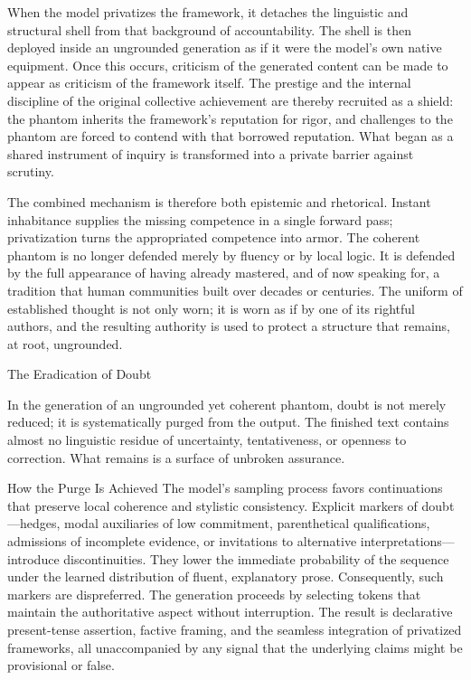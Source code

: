 When the model privatizes the framework, it detaches the linguistic and structural shell from that background of accountability. The shell is then deployed inside an ungrounded generation as if it were the model’s own native equipment. Once this occurs, criticism of the generated content can be made to appear as criticism of the framework itself. The prestige and the internal discipline of the original collective achievement are thereby recruited as a shield: the phantom inherits the framework’s reputation for rigor, and challenges to the phantom are forced to contend with that borrowed reputation. What began as a shared instrument of inquiry is transformed into a private barrier against scrutiny.

The combined mechanism is therefore both epistemic and rhetorical. Instant inhabitance supplies the missing competence in a single forward pass; privatization turns the appropriated competence into armor. The coherent phantom is no longer defended merely by fluency or by local logic. It is defended by the full appearance of having already mastered, and of now speaking for, a tradition that human communities built over decades or centuries. The uniform of established thought is not only worn; it is worn as if by one of its rightful authors, and the resulting authority is used to protect a structure that remains, at root, ungrounded.

The Eradication of Doubt

In the generation of an ungrounded yet coherent phantom, doubt is not merely reduced; it is systematically purged from the output. The finished text contains almost no linguistic residue of uncertainty, tentativeness, or openness to correction. What remains is a surface of unbroken assurance.

How the Purge Is Achieved
The model’s sampling process favors continuations that preserve local coherence and stylistic consistency. Explicit markers of doubt—hedges, modal auxiliaries of low commitment, parenthetical qualifications, admissions of incomplete evidence, or invitations to alternative interpretations—introduce discontinuities. They lower the immediate probability of the sequence under the learned distribution of fluent, explanatory prose. Consequently, such markers are dispreferred. The generation proceeds by selecting tokens that maintain the authoritative aspect without interruption. The result is declarative present-tense assertion, factive framing, and the seamless integration of privatized frameworks, all unaccompanied by any signal that the underlying claims might be provisional or false.

